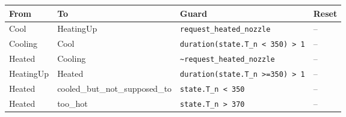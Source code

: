 \begin{tabular}{@{}llp{}p{}@{}}
\toprule
From & To & Guard & Reset \\
\midrule
Cool & HeatingUp & \texttt{request\_heated\_nozzle} & -- \\
Cooling & Cool & \texttt{duration(state.T\_n < 350) > 1} & -- \\
Heated & Cooling & \texttt{\textasciitilde{}request\_heated\_nozzle} & -- \\
HeatingUp & Heated & \texttt{duration(state.T\_n >=350) > 1} & -- \\
Heated & cooled\_but\_not\_supposed\_to & \texttt{state.T\_n < 350} & -- \\
Heated & too\_hot & \texttt{state.T\_n > 370} & -- \\
\bottomrule
\end{tabular}
